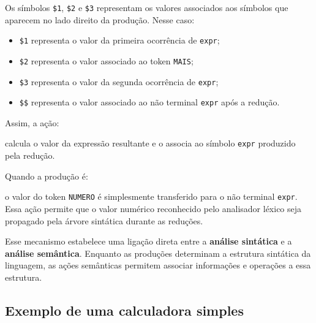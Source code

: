 \documentclass[
  brazilian,
  letterpaper,
]{book}
\newenvironment{Shaded}{\begin{snugshade}}{\end{snugshade}}
\newcommand{\DecValTok}[1]{\textcolor[rgb]{0.68,0.00,0.00}{#1}}
\newcommand{\NormalTok}[1]{\textcolor[rgb]{0.00,0.23,0.31}{#1}}
\newcommand{\OperatorTok}[1]{\textcolor[rgb]{0.37,0.37,0.37}{#1}}
\providecommand{\tightlist}{%
  \setlength{\itemsep}{0pt}\setlength{\parskip}{0pt}}
\theoremstyle{plain}
\theoremstyle{definition}
\theoremstyle{remark}
\begin{document}
Os símbolos \texttt{\$1}, \texttt{\$2} e \texttt{\$3} representam os
valores associados aos símbolos que aparecem no lado direito da
produção. Nesse caso:

\begin{itemize}
\tightlist
\item
  \texttt{\$1} representa o valor da primeira ocorrência de
  \texttt{expr};
\item
  \texttt{\$2} representa o valor associado ao token \texttt{MAIS};
\item
  \texttt{\$3} representa o valor da segunda ocorrência de
  \texttt{expr};
\item
  \texttt{\$\$} representa o valor associado ao não terminal
  \texttt{expr} após a redução.
\end{itemize}

Assim, a ação:

\begin{Shaded}
\end{Shaded}

calcula o valor da expressão resultante e o associa ao símbolo
\texttt{expr} produzido pela redução.

Quando a produção é:

\begin{Shaded}
\end{Shaded}

o valor do token \texttt{NUMERO} é simplesmente transferido para o não
terminal \texttt{expr}. Essa ação permite que o valor numérico
reconhecido pelo analisador léxico seja propagado pela árvore sintática
durante as reduções.

Esse mecanismo estabelece uma ligação direta entre a \textbf{análise
sintática} e a \textbf{análise semântica}. Enquanto as produções
determinam a estrutura sintática da linguagem, as ações semânticas
permitem associar informações e operações a essa estrutura.

\subsection{Exemplo de uma calculadora
simples}\label{exemplo-de-uma-calculadora-simples}
\end{document}

